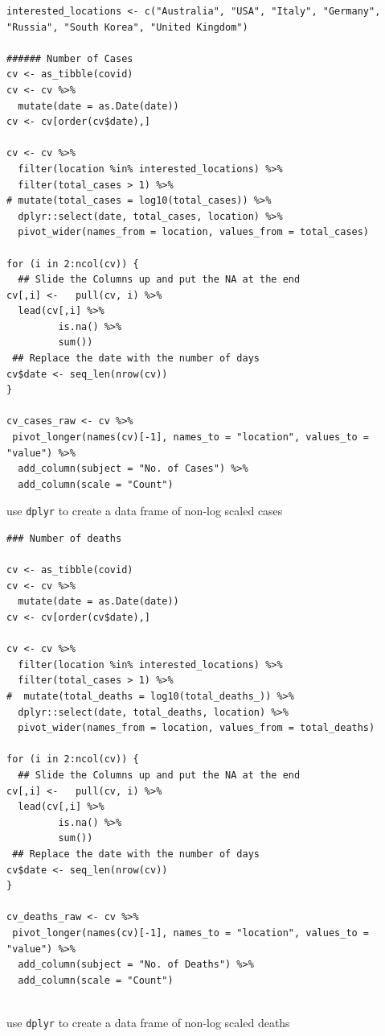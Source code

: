 \documentclass[11pt]{article}
\begin{document}
\begin{listing}[htbp]
\begin{verbatim}
interested_locations <- c("Australia", "USA", "Italy", "Germany", "Russia", "South Korea", "United Kingdom")

###### Number of Cases
cv <- as_tibble(covid)
cv <- cv %>%
  mutate(date = as.Date(date))
cv <- cv[order(cv$date),]

cv <- cv %>%
  filter(location %in% interested_locations) %>%
  filter(total_cases > 1) %>%
# mutate(total_cases = log10(total_cases)) %>%
  dplyr::select(date, total_cases, location) %>%
  pivot_wider(names_from = location, values_from = total_cases)

for (i in 2:ncol(cv)) {
  ## Slide the Columns up and put the NA at the end
cv[,i] <-   pull(cv, i) %>%
  lead(cv[,i] %>%
         is.na() %>%
         sum())
 ## Replace the date with the number of days
cv$date <- seq_len(nrow(cv))
}

cv_cases_raw <- cv %>%
 pivot_longer(names(cv)[-1], names_to = "location", values_to = "value") %>%
  add_column(subject = "No. of Cases") %>%
  add_column(scale = "Count")

\end{verbatim}
\caption{\label{orge0f142a}use \texttt{dplyr} to create a data frame of non-log scaled cases}
\end{listing}

\begin{listing}[htbp]
\begin{verbatim}
### Number of deaths

cv <- as_tibble(covid)
cv <- cv %>%
  mutate(date = as.Date(date))
cv <- cv[order(cv$date),]

cv <- cv %>%
  filter(location %in% interested_locations) %>%
  filter(total_cases > 1) %>%
#  mutate(total_deaths = log10(total_deaths_)) %>%
  dplyr::select(date, total_deaths, location) %>%
  pivot_wider(names_from = location, values_from = total_deaths)

for (i in 2:ncol(cv)) {
  ## Slide the Columns up and put the NA at the end
cv[,i] <-   pull(cv, i) %>%
  lead(cv[,i] %>%
         is.na() %>%
         sum())
 ## Replace the date with the number of days
cv$date <- seq_len(nrow(cv))
}

cv_deaths_raw <- cv %>%
 pivot_longer(names(cv)[-1], names_to = "location", values_to = "value") %>%
  add_column(subject = "No. of Deaths") %>%
  add_column(scale = "Count")


\end{verbatim}
\caption{\label{orgf2506c6}use \texttt{dplyr} to create a data frame of non-log scaled deaths}
\end{listing}
\end{document}
